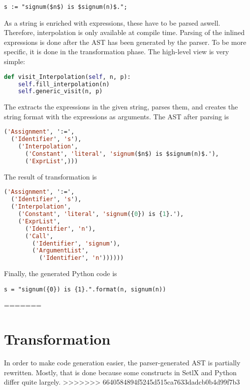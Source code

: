 \begin{lstlisting}
s := "signum($n$) is $signum(n)$.";
\end{lstlisting}

As a string is enriched with expressions, these have to be parsed aswell. Therefore, interpolation is only available at compile time. Parsing of the inlined expressions is done after the AST has been generated by the parser. To be more specific, it is done in the transformation phase. The high-level view is very simple:

\begin{lstlisting}[language=python]
def visit_Interpolation(self, n, p):
    self.fill_interpolation(n)
    self.generic_visit(n, p)
\end{lstlisting}

The  extracts the expressions in the given string, parses them, and creates the string format with the expressions as arguments. The AST after parsing is

\begin{lstlisting}[language=lisp]
('Assignment', ':=', 
  ('Identifier', 's'), 
    ('Interpolation', 
      ('Constant', 'literal', 'signum($n$) is $signum(n)$.'), 
      ('ExprList',)))
\end{lstlisting}

The result of transformation is

\begin{lstlisting}[language=lisp]
('Assignment', ':=', 
  ('Identifier', 's'), 
  ('Interpolation', 
    ('Constant', 'literal', 'signum({0}) is {1}.'), 
    ('ExprList', 
      ('Identifier', 'n'), 
      ('Call', 
        ('Identifier', 'signum'), 
        ('ArgumentList', 
          ('Identifier', 'n'))))))
\end{lstlisting}

Finally, the generated Python code is 

\begin{lstlisting}
s = "signum({0}) is {1}.".format(n, signum(n))
\end{lstlisting}
=======

\section{Transformation}

\label{sec:transformer}

In order to make code generation easier, the parser-generated AST is partially rewritten.  Mostly, that is done because some constructs in SetlX and Python differ quite largely. 
>>>>>>> 6640584894f5245d515ca7633dadcb0b4d99f7b3
